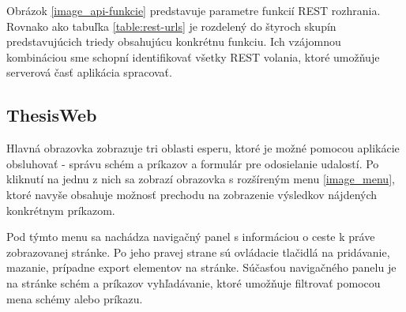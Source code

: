 	Obrázok \ref{image_api-funkcie} predstavuje parametre funkcií REST rozhrania. Rovnako ako tabuľka \ref{table:rest-urls} je rozdelený do štyroch skupín predstavujúcich triedy obsahujúcu konkrétnu funkciu. Ich vzájomnou kombináciou sme schopní identifikovať všetky REST volania, ktoré umožňuje serverová časť aplikácia spracovať.



	\subsection{ThesisWeb}
	Hlavná obrazovka zobrazuje tri oblasti esperu, ktoré je možné pomocou aplikácie obsluhovať - správu schém a príkazov a formulár pre odosielanie udalostí. Po kliknutí na jednu z nich sa zobrazí obrazovka s rozšíreným menu \ref{image_menu}, ktoré navyše obsahuje možnosť prechodu na zobrazenie výsledkov nájdených konkrétnym príkazom.
	
	Pod týmto menu sa nachádza navigačný panel s informáciou o ceste k práve zobrazovanej stránke. Po jeho pravej strane sú ovládacie tlačidlá na pridávanie, mazanie, prípadne export elementov na stránke. Súčasťou navigačného panelu je na stránke schém a príkazov vyhľadávanie, ktoré umožňuje filtrovať pomocou mena schémy alebo príkazu.
	
